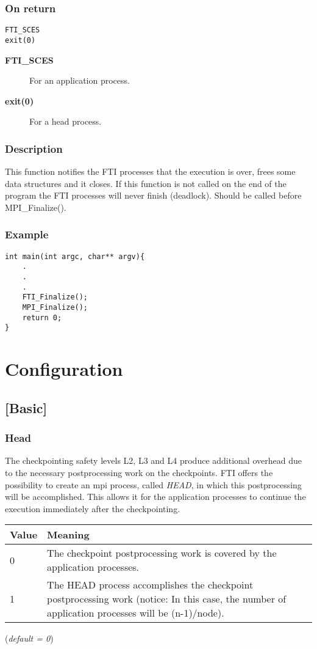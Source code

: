 \documentclass{refrep}
\begin{document}
\subsection*{On return}
\begin{lstlisting}[frame=single]
FTI_SCES
exit(0)
\end{lstlisting}
\begin{description}
\item[\textbf{FTI\_SCES}] For an application process.
\item[\textbf{exit(0)}] For a head process.
\end{description}
\subsection*{Description}
This function notifies the FTI processes that the execution is over, frees some data structures and it closes. If this function is not called on the end of the program the FTI processes will never finish (deadlock). Should be called before MPI\_Finalize().
\subsection*{Example}
\begin{center}
\begin{lstlisting}[frame=single]
int main(int argc, char** argv){
    .
    .
    .
    FTI_Finalize();
    MPI_Finalize();
    return 0;
}
\end{lstlisting}
\end{center}
\chapter{Configuration}\label{ch:configuration}
\section{[Basic]}\label{sec:basic}
\subsection{Head}\label{subsec:head}
The checkpointing safety levels L2, L3 and L4 produce additional overhead due to the necessary postprocessing work on the checkpoints. FTI offers the possibility to create an mpi process, called \emph{HEAD}, in which this postprocessing will be accomplished. This allows it for the application processes to continue the execution immediately after the checkpointing.
\begin{center}
\begin{tabular}[h!]{|p{}|p{}|}
\hline
\textbf{Value} & \textbf{Meaning} \\ \hline
0 & The checkpoint postprocessing work is covered by the application processes. \\ \hline
1 & The HEAD process accomplishes the checkpoint postprocessing work (notice: In this case, the number of application processes will be (n-1)/node). \\
\hline
\end{tabular}
\end{center}
(\textit{default = 0})
\end{document}
